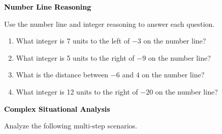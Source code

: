 \documentclass[12pt, letterpaper, fleqn]{article}
\newcommand{\blank}{\underline{\hspace{2.2cm}}}
\begin{document}
\newpage

\begin{tcolorbox}[colback=black!10]
\large\textcolor{black}{\textbf{Number Line Reasoning}}
\end{tcolorbox}

\noindent
Use the number line and integer reasoning to answer each question.

\vspace{3mm}
\begin{enumerate}[itemsep=2.2cm, leftmargin=0.6cm]
\item What integer is 7 units to the left of $-3$ on the number line? \blank

\vspace{2cm}

\item What integer is 5 units to the right of $-9$ on the number line? \blank

\vspace{2cm}

\item What is the distance between $-6$ and $4$ on the number line? \blank

\vspace{2cm}

\item What integer is 12 units to the right of $-20$ on the number line? \blank

\vspace{2cm}
\end{enumerate}

\newpage

\begin{tcolorbox}[colback=black!10]
\large\textcolor{black}{\textbf{Complex Situational Analysis}}
\end{tcolorbox}

\noindent
Analyze the following multi-step scenarios.
\end{document}
